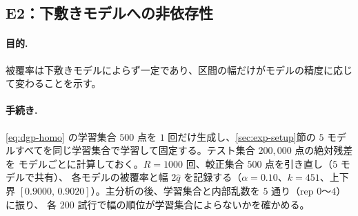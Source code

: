 \documentclass[a4paper,11pt]{jsarticle}
\theoremstyle{definition}
\theoremstyle{plain}
\theoremstyle{remark}
\newcommand{\qhat}{\hat{q}}
\newcommand{\encircle}[1]{\textcircled{\scriptsize #1}}   %
\begin{document}

\subsection{E2：下敷きモデルへの非依存性}
\label{sec:e2}

\paragraph{目的.}
被覆率は下敷きモデルによらず一定であり、区間の幅だけがモデルの精度に応じて変わることを示す。

\paragraph{手続き.}
\eqref{eq:dgp-homo} の学習集合 $500$ 点を $1$ 回だけ生成し、\ref{sec:exp-setup}節の
$5$ モデルすべてを同じ学習集合で学習して固定する。テスト集合 $200{,}000$ 点の絶対残差を
モデルごとに計算しておく。$R=1000$ 回、較正集合 $500$ 点を引き直し（$5$ モデルで共有）、
各モデルの被覆率と幅 $2\qhat$ を記録する（$\alpha=0.10$、$k=451$、上下界
$[0.9000,\,0.9020]$）。主分析の後、学習集合と内部乱数を $5$ 通り（rep $0$〜$4$）に振り、
各 $200$ 試行で幅の順位が学習集合によらないかを確かめる。
\end{document}
